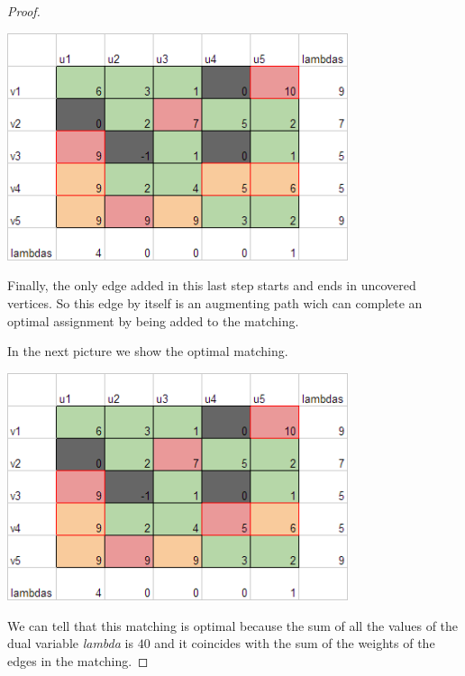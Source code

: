 \begin{proof}
    \begin{center}
        \includegraphics[width=10cm]{Homework2/OptimalAssignment4.png}
    \end{center}\pn

    Finally, the only edge added in this last step starts and ends in uncovered
    vertices. So this edge by itself is an augmenting path wich can complete
    an optimal assignment by being added to the matching.\pn
    
    In the next picture we show the optimal matching.\pn

    \begin{center}
        \includegraphics[width=10cm]{Homework2/OptimalAssignment5.png}
    \end{center}
    
    We can tell that this matching is optimal because the sum of all the
    values of the dual variable \textit{lambda} is $40$ and it coincides with
    the sum of the weights of the edges in the matching.
\end{proof}